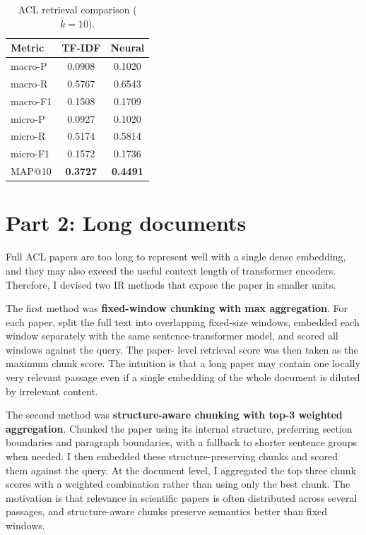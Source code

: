 \documentclass[a4paper,11pt]{article}
\begin{document}
\begin{table}[t]
\centering
\small
\caption{ACL retrieval comparison ($k=10$).}
\label{tab:acl-neural-vs-tfidf}
\begin{tabular}{lcc}
\hline
\textbf{Metric} & \textbf{TF-IDF} & \textbf{Neural} \\
\hline
macro-P & 0.0908 & 0.1020 \\
macro-R & 0.5767 & 0.6543 \\
macro-F1 & 0.1508 & 0.1709 \\
micro-P & 0.0927 & 0.1020 \\
micro-R & 0.5174 & 0.5814 \\
micro-F1 & 0.1572 & 0.1736 \\
MAP@10 & \textbf{0.3727} & \textbf{0.4491} \\
\hline
\end{tabular}
\end{table}

\section*{Part 2: Long documents}
Full ACL papers are too long to represent well with a single dense embedding, and they may
also exceed the useful context length of transformer encoders. Therefore, I devised two IR methods that expose the paper in smaller units.

The first method was \textbf{fixed-window chunking with max aggregation}. For each paper, split
the full text into overlapping fixed-size windows, embedded each window separately with
the same sentence-transformer model, and scored all windows against the query. The paper-
level retrieval score was then taken as the maximum chunk score. The intuition is that a
long paper may contain one locally very relevant passage even if a single embedding of the
whole document is diluted by irrelevant content.

The second method was \textbf{structure-aware chunking with top-3 weighted aggregation}.
Chunked the paper using its internal structure, preferring section
boundaries and paragraph boundaries, with a fallback to shorter sentence groups when
needed. I then embedded these structure-preserving chunks and scored them against the
query. At the document level, I aggregated the top three chunk scores with a weighted
combination rather than using only the best chunk. The motivation is that relevance in
scientific papers is often distributed across several passages, and structure-aware chunks
preserve semantics better than fixed windows.
\end{document}
